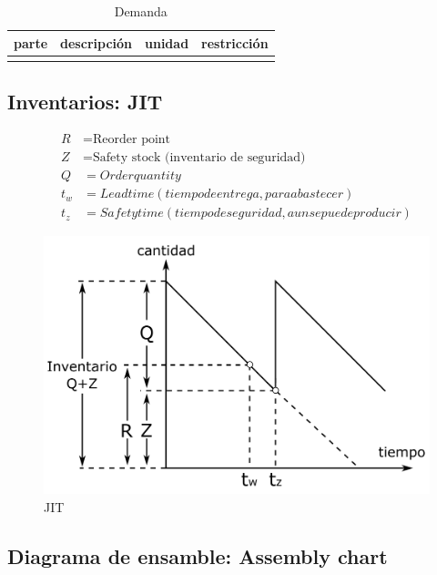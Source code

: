 \begin{table}[h!]
    \centering
    \begin{tabular}{|c|c|c|c|}
        \hline
        parte & descripción & unidad & restricción \\
        \hline
         &  &  &  \\
    \end{tabular}
    \caption{Demanda}
\end{table}

\subsection{Inventarios: JIT}

\[
\begin{split}
    R & = \text{Reorder point} \\
    Z & = \text{Safety stock (inventario de seguridad)} \\
    Q & = Order quantity \\
    t_{w} & = Lead time (tiempo de entrega, para abastecer) \\
    t_{z} & = Safety time (tiempo de seguridad, aun se puede producir)
\end{split}
\]

\begin{figure}[h!]
    \centering
        \includegraphics[scale=0.25]{Manufactura Integrada por Computadora Figuras/Figura05 Just in Time.png}
        \caption{JIT}
\end{figure}

\subsection{Diagrama de ensamble: Assembly chart}

